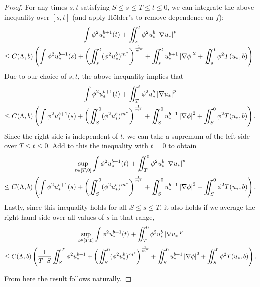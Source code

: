 \begin{proof}
For any times $s,t$ satisfying $S \leq s \leq T \leq t \leq 0$, we can integrate the above inequality over $[s,t]$ (and apply H\"{o}lder's to remove  dependence on $f$): 
\begin{gather*} 
\int \phi^2 u_*^{b+1}(t) + \iint_s^t \phi^2 u_*^b \left\lvert \nabla u_* \right\rvert^p \\
\leq C(\Lambda,b) \left(  \int \phi^2 u_*^{b+1}(s) + \left(  \iint_s^t (\phi^2 u_*^b)^{m^\ast}  \right)^\frac{1}{m^\ast} + \iint_s^t u_*^{b+1} \left\lvert \nabla \phi \right\rvert^2 + \iint_s^t \phi^2 T(u_*,b) \right). 
\end{gather*}
Due to our choice of $s,t$, the above inequality implies that
\begin{gather*}
 \int \phi^2 u_*^{b+1}(t) + \iint_T^t \phi^2 u_*^b \left\lvert \nabla u_* \right\rvert^p \\
 \leq C(\Lambda,b) \left(  \int \phi^2 u_*^{b+1}(s) + \left(  \iint_S^0 (\phi^2 u_*^b)^{m^\ast}  \right)^\frac{1}{m^\ast} + \iint_S^0 u_*^{b+1} \left\lvert \nabla \phi \right\rvert^2 + \iint_S^0 \phi^2 T(u_*,b)  \right). 
\end{gather*}
Since the right side is independent of $t$, we can take a supremum of the left side over $T \leq t \leq 0$.  Add to this the inequality with $t=0$ to obtain
\begin{gather*}
\sup_{t\in[T,0]} \int \phi^2 u_*^{b+1}(t) + \iint_T^0 \phi^2 u_*^b \left\lvert \nabla u_* \right\rvert^p \\
\leq C(\Lambda,b) \left(  \int \phi^2 u_*^{b+1}(s) + \left(  \iint_S^0 (\phi^2 u_*^b)^{m^\ast}  \right)^\frac{1}{m^\ast} + \iint_S^0 u_*^{b+1} \left\lvert \nabla \phi \right\rvert^2 + \iint_S^0 \phi^2 T(u_*,b)  \right).
\end{gather*}
Lastly, since this inequality holds for all $S \leq s \leq T$, it also holds if we average the right hand side over all values of $s$ in that range,
\begin{gather*}
\sup_{t \in [T,0]} \int \phi^2 u_*^{b+1}(t) + \iint_T^0 \phi^2 u_*^b \left\lvert \nabla u_* \right\rvert^p \\
\leq  C(\Lambda,b) \left(  \frac{1}{T\!\! - \!\! S} \iint_S^T \phi^2 u_*^{b+1} + \left(  \iint_S^0 (\phi^2 u_*^b)^{m^\ast}  \right)^\frac{1}{m^\ast} + \iint_S^0 u_*^{b+1} \left\lvert \nabla \phi \right\rvert^2 + \iint_S^0 \phi^2 T(u_*,b)  \right).
\end{gather*}

From here the result follows naturally.  
\end{proof}




